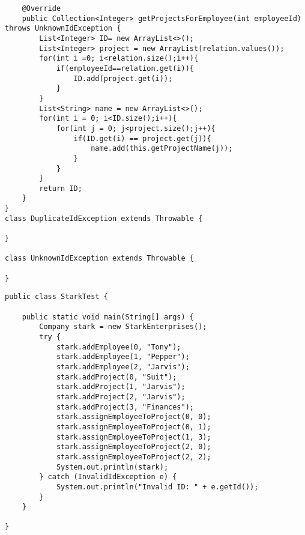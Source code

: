 \documentclass[12pt,a4paper,oneside,ngerman]{article}
\begin{document}
\begin{lstlisting}
    @Override
    public Collection<Integer> getProjectsForEmployee(int employeeId) throws UnknownIdException {
        List<Integer> ID= new ArrayList<>();
        List<Integer> project = new ArrayList(relation.values());
        for(int i =0; i<relation.size();i++){
            if(employeeId==relation.get(i)){
                ID.add(project.get(i));
            }
        }
        List<String> name = new ArrayList<>();
        for(int i = 0; i<ID.size();i++){
            for(int j = 0; j<project.size();j++){
                if(ID.get(i) == project.get(j)){
                    name.add(this.getProjectName(j));
                }
            }
        }
        return ID;
    }
}
class DuplicateIdException extends Throwable {

}

class UnknownIdException extends Throwable {

}
\end{lstlisting}

\begin{lstlisting}
public class StarkTest {

	public static void main(String[] args) {
		Company stark = new StarkEnterprises();
		try {
			stark.addEmployee(0, "Tony");
			stark.addEmployee(1, "Pepper");
			stark.addEmployee(2, "Jarvis");
			stark.addProject(0, "Suit");
			stark.addProject(1, "Jarvis");
			stark.addProject(2, "Jarvis");
			stark.addProject(3, "Finances");
			stark.assignEmployeeToProject(0, 0);
			stark.assignEmployeeToProject(0, 1);
			stark.assignEmployeeToProject(1, 3);
			stark.assignEmployeeToProject(2, 0);
			stark.assignEmployeeToProject(2, 2);
			System.out.println(stark);
		} catch (InvalidIdException e) {
			System.out.println("Invalid ID: " + e.getId());
		}
	}

}

\end{lstlisting}

\begin{lstlisting}
\end{lstlisting}
\end{document}
